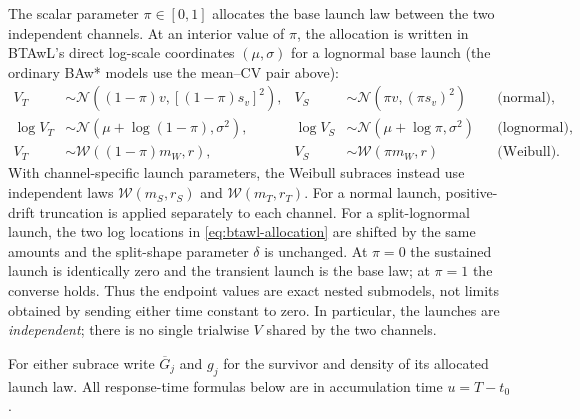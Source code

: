 \documentclass[12pt]{article}
\newcommand{\Normal}{\mathcal{N}}
\theoremstyle{remark}
\begin{document}
The scalar parameter $\pi\in[0,1]$ allocates the base launch law between the two independent channels.  At an interior value of $\pi$, the allocation is written in BTAwL's direct log-scale coordinates $(\mu,\sigma)$ for a lognormal base launch (the ordinary BAw* models use the mean--CV pair above):
\begin{align}
  V_T&\sim\Normal((1-\pi)v,[(1-\pi)s_v]^2),&
  V_S&\sim\Normal(\pi v,(\pi s_v)^2)
  &&\text{(normal)},\\
  \log V_T&\sim\Normal(\mu+\log(1-\pi),\sigma^2),&
  \log V_S&\sim\Normal(\mu+\log\pi,\sigma^2)
  &&\text{(lognormal)},\\
  V_T&\sim\mathcal W((1-\pi)m_W,r),&
  V_S&\sim\mathcal W(\pi m_W,r)
  &&\text{(Weibull)}.
  \label{eq:btawl-allocation}
\end{align}
With channel-specific launch parameters, the Weibull subraces instead use independent laws $\mathcal W(m_S,r_S)$ and $\mathcal W(m_T,r_T)$. For a normal launch, positive-drift truncation is applied separately to each channel.  For a split-lognormal launch, the two log locations in \eqref{eq:btawl-allocation} are shifted by the same amounts and the split-shape parameter $\delta$ is unchanged.  At $\pi=0$ the sustained launch is identically zero and the transient launch is the base law; at $\pi=1$ the converse holds.  Thus the endpoint values are exact nested submodels, not limits obtained by sending either time constant to zero.  In particular, the launches are \emph{independent}; there is no single trialwise $V$ shared by the two channels.

For either subrace write $\overline G_j$ and $g_j$ for the survivor and density of its allocated launch law.  All response-time formulas below are in accumulation time $u=T-t_0$.
\end{document}
